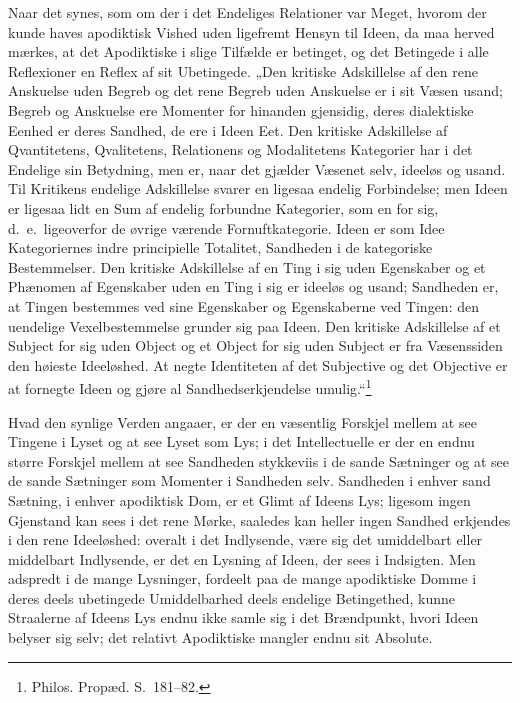 \documentclass[12pt]{book}
\newcommand{\opage}[1]{\marginnote{\footnotesize\textit{[#1]}}}
\begin{document}
Naar det synes, som om der i det Endeliges Relationer var Meget, hvorom der kunde haves apodiktisk Vished uden ligefremt Hensyn til Ideen, da maa herved mærkes, at det Apodiktiske i slige Tilfælde er betinget, og det Betingede i alle Reflexioner en Reflex af sit Ubetingede. „Den kritiske Adskillelse af den rene Anskuelse uden Begreb og det rene Begreb uden Anskuelse er i sit Væsen usand; Begreb og Anskuelse ere Momenter for hinanden gjensidig, deres dialektiske Eenhed er deres Sandhed, de ere i Ideen Eet. Den kritiske Adskillelse af Qvantitetens, Qvalitetens, Relationens og Modalitetens
\opage{261}Kategorier har i det Endelige sin Betydning, men er, naar det gjælder Væsenet selv, ideeløs og usand. Til Kritikens endelige Adskillelse svarer en ligesaa endelig Forbindelse; men Ideen er ligesaa lidt en Sum af endelig forbundne Kategorier, som en for sig, d.\ e.\ ligeoverfor de øvrige værende Fornuftkategorie. Ideen er som Idee Kategoriernes indre principielle Totalitet, Sandheden i de kategoriske Bestemmelser. Den kritiske Adskillelse af en Ting i sig uden Egenskaber og et Phænomen af Egenskaber uden en Ting i sig er ideeløs og usand; Sandheden er, at Tingen bestemmes ved sine Egenskaber og Egenskaberne ved Tingen: den uendelige Vexelbestemmelse grunder sig paa Ideen. Den kritiske Adskillelse af et Subject for sig uden Object og et Object for sig uden Subject er fra Væsenssiden den høieste Ideeløshed. At negte Identiteten af det Subjective og det Objective er at fornegte Ideen og gjøre al Sandhedserkjendelse umulig.“\footnote{Philos. Propæd. S.~181--82.}%

Hvad den synlige Verden angaaer, er der en væsentlig Forskjel mellem at see Tingene i Lyset og at see Lyset som Lys; i det Intellectuelle er der en endnu større Forskjel mellem at see Sandheden stykkeviis i de sande Sætninger og at see de sande Sætninger som Momenter i Sandheden selv. Sandheden i enhver sand Sætning, i enhver apodiktisk Dom, er et Glimt af Ideens Lys; ligesom ingen Gjenstand kan sees i det rene Mørke, saaledes kan heller ingen Sandhed erkjendes i den rene Ideeløshed: overalt i det Indlysende, være sig det umiddelbart eller middelbart Indlysende, er det en Lysning af Ideen, der sees i Indsigten. Men adspredt i de mange Lysninger, fordeelt paa de mange apodiktiske Domme i deres deels ubetingede Umiddelbarhed deels endelige Betingethed, kunne Straalerne af Ideens Lys endnu ikke samle sig i det Brændpunkt, hvori Ideen belyser sig selv; det relativt Apodiktiske mangler endnu sit Absolute.
\end{document}

